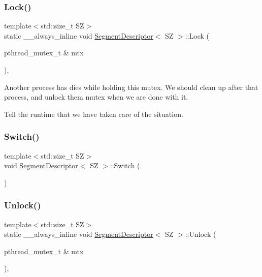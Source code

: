 \mbox{\label{classSegmentDescriptor_ab5cc70efd5c89b3466174bb48e951ede}} 
\subsubsection{\texorpdfstring{Lock()}{Lock()}}
{\footnotesize\ttfamily template$<$std\+::size\+\_\+t SZ$>$ \\
static \+\_\+\+\_\+always\+\_\+inline void \hyperlink{classSegmentDescriptor}{Segment\+Descriptor}$<$ SZ $>$\+::Lock (\begin{DoxyParamCaption}\item[{pthread\+\_\+mutex\+\_\+t \&}]{mtx }\end{DoxyParamCaption})\hspace{0.3cm}{\ttfamily [inline]}, {\ttfamily [static]}}

Another process has dies while holding this mutex. We should clean up after that process, and unlock them mutex when we are done with it.

Tell the runtime that we have taken care of the situation.\mbox{\label{classSegmentDescriptor_aca5320d3edfabec89285c251b8c25094}} 
\subsubsection{\texorpdfstring{Switch()}{Switch()}}
{\footnotesize\ttfamily template$<$std\+::size\+\_\+t SZ$>$ \\
void \hyperlink{classSegmentDescriptor}{Segment\+Descriptor}$<$ SZ $>$\+::Switch (\begin{DoxyParamCaption}{ }\end{DoxyParamCaption})\hspace{0.3cm}{\ttfamily [inline]}}

\mbox{\label{classSegmentDescriptor_aed5e493d85b1132056e180861799557d}} 
\subsubsection{\texorpdfstring{Unlock()}{Unlock()}}
{\footnotesize\ttfamily template$<$std\+::size\+\_\+t SZ$>$ \\
static \+\_\+\+\_\+always\+\_\+inline void \hyperlink{classSegmentDescriptor}{Segment\+Descriptor}$<$ SZ $>$\+::Unlock (\begin{DoxyParamCaption}\item[{pthread\+\_\+mutex\+\_\+t \&}]{mtx }\end{DoxyParamCaption})\hspace{0.3cm}{\ttfamily [inline]}, {\ttfamily [static]}}


